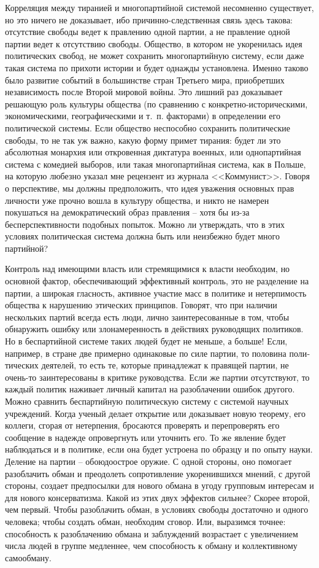 \documentclass{book}
\begin{document}
Корреляция между тиранией и многопартийной системой несомненно существует, но это ничего не доказывает, ибо при­чинно-следственная связь здесь такова: отсутствие свободы ведет к правлению одной партии, а не правление одной партии ведет к отсутствию свободы. Общество, в котором не укоре­нилась идея политических свобод, не может сохранить много­партийную систему, если даже такая система по прихоти исто­рии и будет однажды установлена. Именно таково было разви­тие событий в большинстве стран Третьего мира, приобретших независимость после Второй мировой войны. Это лишний раз доказывает решающую роль культуры общества (по сравнению с конкретно-историческими, экономическими, географическими и т.~п. факторами) в определении его политической системы. Если общество неспособно сохранить политические свободы, то не так уж важно, какую форму примет тирания: будет ли это абсолютная монархия или откровенная диктатура военных, или однопартийная система с комедией выборов, или такая многопартийная система, как в Польше, на 
которую любезно указал мне рецензент из журнала <<Коммунист>>. Говоря о пер­спективе, мы должны предположить, что идея уважения основ­ных прав личности уже прочно вошла в культуру общества, и никто не намерен покушаться на демократический образ прав­ления -- хотя бы из-за бесперспективности подобных попыток. Можно ли утверждать, что в этих условиях политическая система должна быть или неизбежно будет много партийной?

Контроль над имеющими власть или стремящимися к власти необходим, но основной фактор, обеспечивающий эффективный контроль, это не разделение на партии, а широкая гласность, активное участие масс в политике и нетерпимость общества к нарушению этических принципов. Говорят, что при наличии нескольких партий всегда есть люди, лично заинтересованные в том, чтобы обнаружить ошибку или злонамеренность в дей­ствиях руководящих политиков. Но в беспартийной системе таких людей будет не меньше, а больше! Если, например, в стра­не две примерно одинаковые по силе партии, то половина поли­тических деятелей, то есть те, которые принадлежат к правящей партии, не очень-то заинтересованы в критике руководства. Если же партии отсутствуют, то каждый политик наживает личный капитал на разоблачении ошибок другого. Можно срав­нить беспартийную политическую систему с системой научных учреждений. Когда ученый делает открытие или доказывает новую теорему, его коллеги, сгорая от нетерпения, бросаются проверять и перепроверять его 
сообщение в надежде опроверг­нуть или уточнить его. То же явление будет наблюдаться и в политике, если она будет устроена по образцу и по опыту науки. Деление на партии -- обоюдоострое оружие. С одной стороны, оно помогает разоблачить обман и преодолеть сопротивление укоренившихся мнений, с другой стороны, создает предпосыл­ки для нового обмана в угоду групповым интересам и для но­вого консерватизма. Какой из этих двух эффектов сильнее? Скорее второй, чем первый. Чтобы разоблачить обман, в усло­виях свободы достаточно и одного человека; чтобы создать обман, необходим сговор. Или, выразимся точнее: способность к разоблачению обмана и заблуждений возрастает с увеличе­нием числа людей в группе медленнее, чем способность к обма­ну и коллективному самообману.
\end{document}
